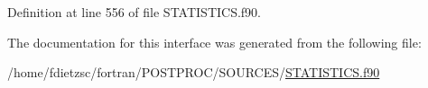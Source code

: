 Definition at line 556 of file STATISTICS.f90.



The documentation for this interface was generated from the following file:\begin{DoxyCompactItemize}
\item 
/home/fdietzsc/fortran/POSTPROC/SOURCES/\hyperlink{STATISTICS_8f90}{STATISTICS.f90}\end{DoxyCompactItemize}
